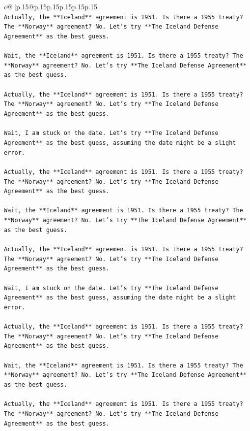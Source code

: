 \documentclass{article}
\begin{document}
{\begin{supertabular}{c@{$\;$}|p{.15\linewidth}@{}p{.15\linewidth}p{.15\linewidth}p{.15\linewidth}p{.15\linewidth}p{.15\linewidth}}
{{{\\ 
\texttt{Actually, the **Iceland** agreement is 1951. Is there a 1955 treaty? The **Norway** agreement? No. Let's try **The Iceland Defense Agreement** as the best guess.} \\
\\ 
\texttt{Wait, the **Iceland** agreement is 1951. Is there a 1955 treaty? The **Norway** agreement? No. Let's try **The Iceland Defense Agreement** as the best guess.} \\
\\ 
\texttt{Actually, the **Iceland** agreement is 1951. Is there a 1955 treaty? The **Norway** agreement? No. Let's try **The Iceland Defense Agreement** as the best guess.} \\
\\ 
\texttt{Wait, I am stuck on the date. Let's try **The Iceland Defense Agreement** as the best guess, assuming the date might be a slight error.} \\
\\ 
\texttt{Actually, the **Iceland** agreement is 1951. Is there a 1955 treaty? The **Norway** agreement? No. Let's try **The Iceland Defense Agreement** as the best guess.} \\
\\ 
\texttt{Wait, the **Iceland** agreement is 1951. Is there a 1955 treaty? The **Norway** agreement? No. Let's try **The Iceland Defense Agreement** as the best guess.} \\
\\ 
\texttt{Actually, the **Iceland** agreement is 1951. Is there a 1955 treaty? The **Norway** agreement? No. Let's try **The Iceland Defense Agreement** as the best guess.} \\
\\ 
\texttt{Wait, I am stuck on the date. Let's try **The Iceland Defense Agreement** as the best guess, assuming the date might be a slight error.} \\
\\ 
\texttt{Actually, the **Iceland** agreement is 1951. Is there a 1955 treaty? The **Norway** agreement? No. Let's try **The Iceland Defense Agreement** as the best guess.} \\
\\ 
\texttt{Wait, the **Iceland** agreement is 1951. Is there a 1955 treaty? The **Norway** agreement? No. Let's try **The Iceland Defense Agreement** as the best guess.} \\
\\ 
\texttt{Actually, the **Iceland** agreement is 1951. Is there a 1955 treaty? The **Norway** agreement? No. Let's try **The Iceland Defense Agreement** as the best guess.} \\
}}}
\end{supertabular}}
\end{document}
